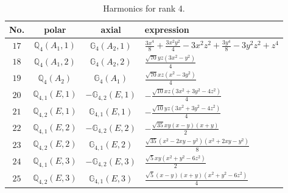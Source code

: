 \documentclass[fleqn,8pt,landscape]{jsarticle}
\begin{document}
\begin{table}[ht!]
\begin{center}
\caption{Harmonics for rank 4.}
\renewcommand{\arraystretch}{1.3}
\begin{tabular}{cccl} \hline \hline
No. & polar & axial & expression \\ \hline
$ 17 $ & $ \mathbb{Q}_{4}(A_{1},1) $ & $ \mathbb{G}_{4}(A_{2},1) $ & $ \frac{3 x^{4}}{8} + \frac{3 x^{2} y^{2}}{4} - 3 x^{2} z^{2} + \frac{3 y^{4}}{8} - 3 y^{2} z^{2} + z^{4} $ \\
$ 18 $ & $ \mathbb{Q}_{4}(A_{1},2) $ & $ \mathbb{G}_{4}(A_{2},2) $ & $ \frac{\sqrt{70} y z \left(3 x^{2} - y^{2}\right)}{4} $ \\
$ 19 $ & $ \mathbb{Q}_{4}(A_{2}) $ & $ \mathbb{G}_{4}(A_{1}) $ & $ \frac{\sqrt{70} x z \left(x^{2} - 3 y^{2}\right)}{4} $ \\
$ 20 $ & $ \mathbb{Q}_{4,1}(E,1) $ & $ -\mathbb{G}_{4,2}(E,1) $ & $ - \frac{\sqrt{10} x z \left(3 x^{2} + 3 y^{2} - 4 z^{2}\right)}{4} $ \\
$ 21 $ & $ \mathbb{Q}_{4,2}(E,1) $ & $ \mathbb{G}_{4,1}(E,1) $ & $ - \frac{\sqrt{10} y z \left(3 x^{2} + 3 y^{2} - 4 z^{2}\right)}{4} $ \\
$ 22 $ & $ \mathbb{Q}_{4,1}(E,2) $ & $ -\mathbb{G}_{4,2}(E,2) $ & $ - \frac{\sqrt{35} x y \left(x - y\right) \left(x + y\right)}{2} $ \\
$ 23 $ & $ \mathbb{Q}_{4,2}(E,2) $ & $ \mathbb{G}_{4,1}(E,2) $ & $ \frac{\sqrt{35} \left(x^{2} - 2 x y - y^{2}\right) \left(x^{2} + 2 x y - y^{2}\right)}{8} $ \\
$ 24 $ & $ \mathbb{Q}_{4,1}(E,3) $ & $ -\mathbb{G}_{4,2}(E,3) $ & $ \frac{\sqrt{5} x y \left(x^{2} + y^{2} - 6 z^{2}\right)}{2} $ \\
$ 25 $ & $ \mathbb{Q}_{4,2}(E,3) $ & $ \mathbb{G}_{4,1}(E,3) $ & $ \frac{\sqrt{5} \left(x - y\right) \left(x + y\right) \left(x^{2} + y^{2} - 6 z^{2}\right)}{4} $ \\
 \hline \hline
\end{tabular}
\end{center}
\end{table}
\end{document}
